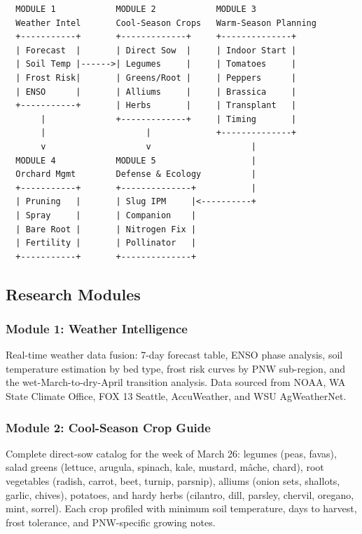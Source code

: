 \documentclass[11pt,letterpaper]{article}
\begin{document}
\begin{asciibox}
\begin{verbatim}
  MODULE 1            MODULE 2            MODULE 3
  Weather Intel       Cool-Season Crops   Warm-Season Planning
  +-----------+       +-------------+     +--------------+
  | Forecast  |       | Direct Sow  |     | Indoor Start |
  | Soil Temp |------>| Legumes     |     | Tomatoes     |
  | Frost Risk|       | Greens/Root |     | Peppers      |
  | ENSO      |       | Alliums     |     | Brassica     |
  +-----------+       | Herbs       |     | Transplant   |
       |              +-------------+     | Timing       |
       |                    |             +--------------+
       v                    v                    |
  MODULE 4            MODULE 5                   |
  Orchard Mgmt        Defense & Ecology          |
  +-----------+       +--------------+           |
  | Pruning   |       | Slug IPM     |<----------+
  | Spray     |       | Companion    |
  | Bare Root |       | Nitrogen Fix |
  | Fertility |       | Pollinator   |
  +-----------+       +--------------+
\end{verbatim}
\end{asciibox}

\subsection{Research Modules}

\subsubsection{Module 1: Weather Intelligence}
Real-time weather data fusion: 7-day forecast table, ENSO phase analysis, soil temperature estimation by bed type, frost risk curves by PNW sub-region, and the wet-March-to-dry-April transition analysis. Data sourced from NOAA, WA State Climate Office, FOX 13 Seattle, AccuWeather, and WSU AgWeatherNet.

\subsubsection{Module 2: Cool-Season Crop Guide}
Complete direct-sow catalog for the week of March 26: legumes (peas, favas), salad greens (lettuce, arugula, spinach, kale, mustard, mâche, chard), root vegetables (radish, carrot, beet, turnip, parsnip), alliums (onion sets, shallots, garlic, chives), potatoes, and hardy herbs (cilantro, dill, parsley, chervil, oregano, mint, sorrel). Each crop profiled with minimum soil temperature, days to harvest, frost tolerance, and PNW-specific growing notes.
\end{document}
